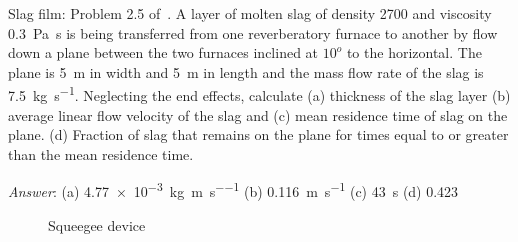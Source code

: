 
\begin{question} 
Slag film: Problem 2.5 of~\cite{gaskell}. A layer of molten slag of density \SI{2700}{\kgpmc} and viscosity \SI{0.3}{\pascal\second} is being transferred from one reverberatory furnace to another by flow down a plane between the two furnaces inclined at $10^o$ to the horizontal. The plane is \SI{5}{\metre} in width and \SI{5}{\metre} in length and the mass flow rate of the slag is \SI{7.5}{\kilo\gram\per\second}. Neglecting the end effects, calculate (a) thickness of the slag layer (b) average linear flow velocity of the slag and (c) mean residence time of slag on the plane. (d) Fraction of slag that remains on the plane for times equal to or greater than the mean residence time.
\end{question}
\begin{solution}[print]
{\it Answer}: 
(a) \SI{4.77e-3}{\kilo\gram\per\metre\per\second}
(b) \SI{0.116}{\metre\per\second}
(c) \SI{43}{\second}
(d) \num{0.423}
\end{solution}


\begin{figure}[h]
\label{squeegee}
\begin{center}
\end{center}
\caption{Squeegee device}
\end{figure}

